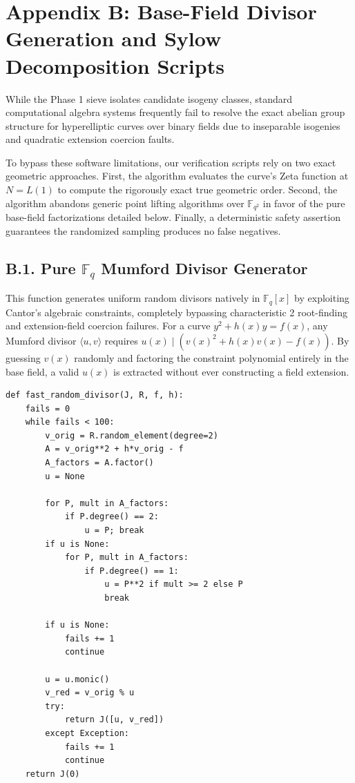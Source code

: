 \documentclass[letterpaper, 11pt]{article}
\begin{document}
\section{Appendix B: Base-Field Divisor Generation and Sylow Decomposition Scripts}
While the Phase 1 sieve isolates candidate isogeny classes, standard computational algebra systems frequently fail to resolve the exact abelian group structure for hyperelliptic curves over binary fields due to inseparable isogenies and quadratic extension coercion faults. 

To bypass these software limitations, our verification scripts rely on two exact geometric approaches. First, the algorithm evaluates the curve's Zeta function at $N = L(1)$ to compute the rigorously exact true geometric order. Second, the algorithm abandons generic point lifting algorithms over $\mathbb{F}_{q^2}$ in favor of the pure base-field factorizations detailed below. Finally, a deterministic safety assertion guarantees the randomized sampling produces no false negatives.

\subsection{B.1. Pure \texorpdfstring{$\mathbb{F}_q$}{F\_q} Mumford Divisor Generator}
This function generates uniform random divisors natively in $\mathbb{F}_q[x]$ by exploiting Cantor's algebraic constraints, completely bypassing characteristic 2 root-finding and extension-field coercion failures. For a curve $y^2+h(x)y=f(x)$, any Mumford divisor $\langle u, v \rangle$ requires $u(x) \mid (v(x)^2 + h(x)v(x) - f(x))$. By guessing $v(x)$ randomly and factoring the constraint polynomial entirely in the base field, a valid $u(x)$ is extracted without ever constructing a field extension.

\begin{lstlisting}
def fast_random_divisor(J, R, f, h):
    fails = 0
    while fails < 100:
        v_orig = R.random_element(degree=2)
        A = v_orig**2 + h*v_orig - f
        A_factors = A.factor()
        u = None
        
        for P, mult in A_factors:
            if P.degree() == 2:
                u = P; break
        if u is None:
            for P, mult in A_factors:
                if P.degree() == 1:
                    u = P**2 if mult >= 2 else P
                    break
                    
        if u is None:
            fails += 1
            continue
            
        u = u.monic()
        v_red = v_orig % u
        try:
            return J([u, v_red])
        except Exception:
            fails += 1
            continue
    return J(0) 
\end{lstlisting}
\end{document}
